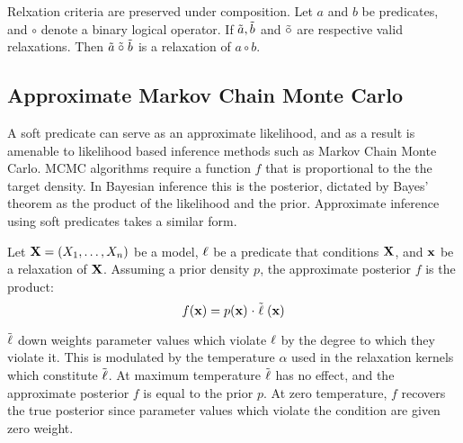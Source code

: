 \begin{proposition}Relxation criteria are preserved under composition.
Let $a$ and $b$ be predicates, and $\circ$ denote a binary logical operator.  If $\tilde{a}, \tilde{b}$ and $\mathrel{\tilde{\circ}}$ are respective valid relaxations.  Then $\tilde{a} \mathrel{\tilde{\circ}} \tilde{b}$ is a relaxation of $a \circ b$.
\end{proposition}



\subsection{Approximate Markov Chain Monte Carlo}
A soft predicate can serve as an approximate likelihood, and as a result is amenable to likelihood based inference methods such as Markov Chain Monte Carlo.
MCMC algorithms require a function $f$ that is proportional to the the target density.
In Bayesian inference this is the posterior, dictated by Bayes' theorem as the product of the likelihood and the prior.
Approximate inference using soft predicates takes a similar form.

\begin{definition}
Let $\mathbf{X} = (X_1, \dots, X_n)$ be a model, $\operatorname{\ell}$ be a predicate that conditions $\mathbf{X}$, and  $\mathbf{x}$ be a relaxation of $\mathbf{X}$.
Assuming a prior density $p$, the approximate posterior $f$ is the product:
\begin{equation}\label{fpm}
f(\mathbf{x}) = p(\mathbf{x}) \; \cdot \mathrel{\tilde{\operatorname{\ell}}}(\mathbf{x})
  \end{equation}
\end{definition}
$\mathrel{\tilde{\operatorname{\ell}}}$ down weights parameter values which violate $\operatorname{\ell}$ by the degree to which they violate it. 
This is modulated by the temperature $\alpha$ used in the  relaxation kernels which constitute $\mathrel{\tilde{\operatorname{\ell}}}$.
At maximum temperature $\mathrel{\tilde{\operatorname{\ell}}}$ has no effect, and the approximate posterior $f$ is equal to the prior $p$.
At zero temperature, $f$ recovers the true posterior since parameter values which violate the condition are given zero weight.

